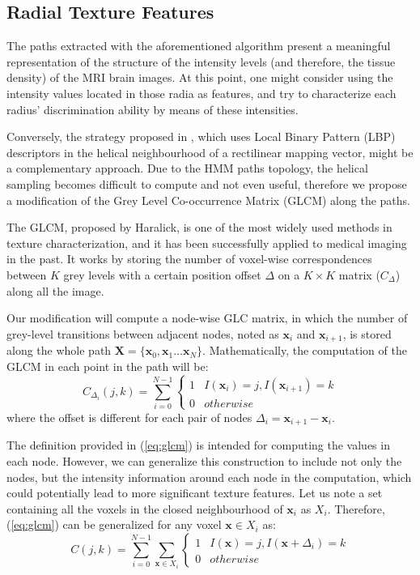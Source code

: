 \subsection{Radial Texture Features}\label{sec:rtextfeat}
The paths extracted with the aforementioned algorithm present a meaningful representation of the structure of the intensity levels (and therefore, the tissue density) of the MRI brain images. At this point, one might consider using the intensity values located in those radia as features, and try to characterize each radius' discrimination ability by means of these intensities. 

Conversely, the strategy proposed in \cite{Martinez-MurciaVRLBP}, which uses Local Binary Pattern (LBP) descriptors in the helical neighbourhood of a rectilinear mapping vector, might be a complementary approach. Due to the \ac{HMM} paths topology, the helical sampling becomes difficult to compute and not even useful, therefore we propose a modification of the Grey Level Co-occurrence Matrix (GLCM) along the paths. 

The GLCM, proposed by Haralick\cite{Haralick73}, is one of the most widely used methods in texture characterization, and it has been successfully applied to medical imaging in the past\cite{kovalev2001three,martinez2014parametrization}. It works by storing the number of voxel-wise correspondences between $K$ grey levels with a certain position offset $\Delta$ on a  $K\times K$ matrix ($C_{\Delta}$) along all the image. 

Our modification will compute a node-wise GLC matrix, in which the number of grey-level transitions between adjacent nodes, noted as $\mathbf{x}_i$ and $\mathbf{x}_{i+1}$, is stored along the whole path $\mathbf{X} = \{\mathbf{x}_0, \mathbf{x}_1 \dots \mathbf{x}_N\}$. Mathematically, the computation of the GLCM in each point in the path will be: 
\begin{equation}\label{eq:glcm}
C_{\Delta_i}(j,k) = \sum_{i=0}^{N-1}
\begin{cases}
1 & I(\mathbf{x}_i) = j, I(\mathbf{x}_{i+1})=k\\
0 & otherwise
\end{cases}
\end{equation}
where the offset is different for each pair of nodes $\Delta_i=\mathbf{x}_{i+1}-\mathbf{x}_i$. 

The definition provided in (\ref{eq:glcm}) is intended for computing the values in each node. However, we can generalize this construction to include not only the nodes, but the intensity information around each node in the computation, which could potentially lead to more significant texture features. Let us note a set containing all the voxels in the closed neighbourhood of $\mathbf{x}_i$ as $X_i$. Therefore, (\ref{eq:glcm}) can be generalized for any voxel $\mathbf{x} \in X_i$ as:
\begin{equation}\label{eq:glcmGen}
C(j,k) = \sum_{i=0}^{N-1} \sum_{\mathbf{x} \in X_i}
\begin{cases}
1 & I(\mathbf{x}) = j, I(\mathbf{x}+\Delta_i)=k\\
0 & otherwise
\end{cases}
\end{equation}

